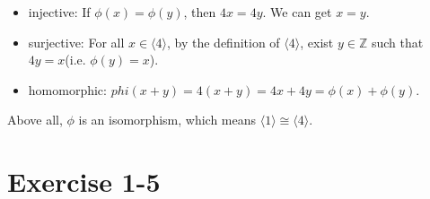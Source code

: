\documentclass{article}
\begin{document}
			\begin{itemize}
				\item injective: If $\phi(x) = \phi(y)$, then $4x = 4y$. We can get $x =
					y$.
				\item surjective: For all $x \in \langle 4 \rangle$, by the definition
					of $\langle 4 \rangle$, exist $y \in \mathbb{Z}$ such that $4y =
					x$(i.e. $\phi(y) = x$).
				\item homomorphic: $phi(x+y) = 4(x+y) = 4x + 4y = \phi(x) + \phi(y)$.
			\end{itemize}

			Above all, $\phi$ is an isomorphism, which means $\langle 1 \rangle \cong
			\langle 4 \rangle$.

	\section*{Exercise 1-5}
\end{document}
